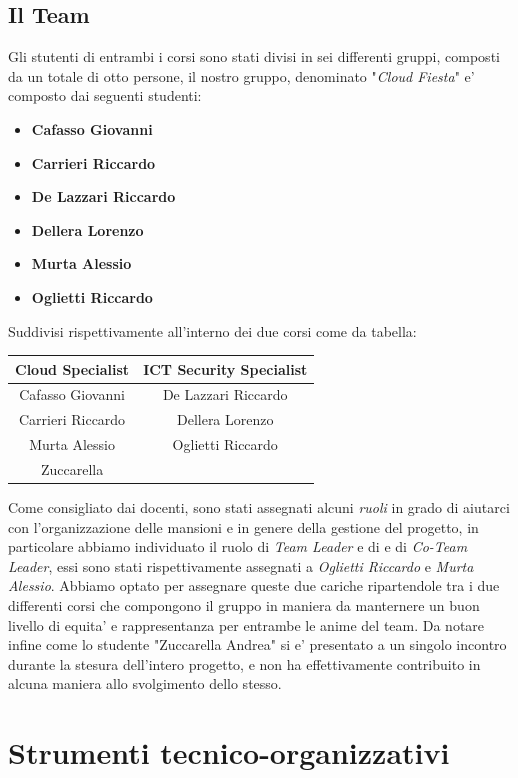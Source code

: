 \documentclass[a4paper]{report}
\begin{document}
	\section{Il Team} \label{il_team}
		Gli stutenti di entrambi i corsi sono stati divisi in sei differenti gruppi, composti da un totale di otto persone,
		il nostro gruppo, denominato "\emph{Cloud Fiesta}" e' composto dai seguenti studenti:
		\begin{itemize}
			\item \textbf{Cafasso Giovanni}
			\item \textbf{Carrieri Riccardo}
			\item \textbf{De Lazzari Riccardo}
			\item \textbf{Dellera Lorenzo}
			\item \textbf{Murta Alessio}
			\item \textbf{Oglietti Riccardo}
		\end{itemize}
		Suddivisi rispettivamente all'interno dei due corsi come da tabella:
		\begin{center}
			\begin{tabular}{c|c}
				Cloud Specialist & ICT Security Specialist \\
				\hline
				Cafasso Giovanni & De Lazzari Riccardo \\
				Carrieri Riccardo & Dellera Lorenzo \\
				Murta Alessio & Oglietti Riccardo \\
				Zuccarella & \\
			\end{tabular}
		\end{center}
		Come consigliato dai docenti, sono stati assegnati alcuni \emph{ruoli} in grado di aiutarci con l'organizzazione
		delle mansioni e in genere della gestione del progetto, in particolare abbiamo individuato il ruolo di
		\emph{Team Leader} e di e di \emph{Co-Team Leader}, essi sono stati rispettivamente assegnati a \emph{Oglietti
		Riccardo} e \emph{Murta Alessio}. Abbiamo optato per assegnare queste due cariche ripartendole tra i due
		differenti corsi che compongono il gruppo in maniera da manternere un buon livello di equita' e rappresentanza
		per entrambe le anime del team.  Da notare infine come lo studente "Zuccarella Andrea" si e' presentato a un
		singolo incontro durante la stesura dell'intero progetto, e non ha effettivamente contribuito in alcuna maniera
		allo svolgimento dello stesso.

\chapter{Strumenti tecnico-organizzativi}
\end{document}
